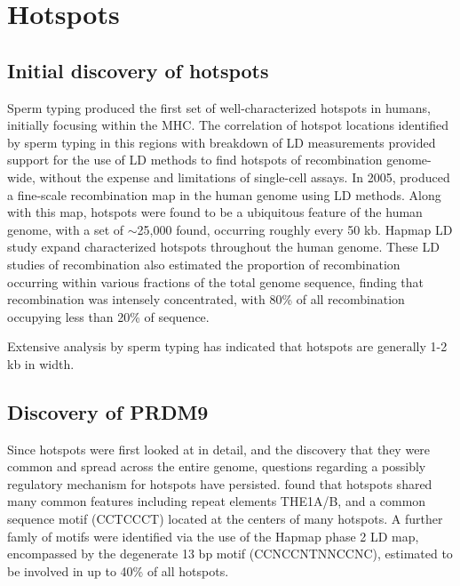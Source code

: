 \section{Hotspots}

\subsection{Initial discovery of hotspots}

Sperm typing produced the first set of well-characterized hotspots in humans, initially focusing within the MHC\cite{Jeffreys2000,Jeffreys2001}.
The correlation of hotspot locations identified by sperm typing in this regions with breakdown of LD measurements provided support for the use of LD methods to find hotspots of recombination genome-wide, without the expense and limitations of single-cell assays\cite{Jeffreys2001}.
In 2005, \citet{Myers2005} produced a fine-scale recombination map in the human genome using LD methods.
Along with this map, hotspots were found to be a ubiquitous feature of the human genome, with a set of $\sim$25,000 found, occurring roughly every 50 kb.
Hapmap LD study expand characterized hotspots throughout the human genome.
These LD studies of recombination also estimated the proportion of recombination occurring within various fractions of the total genome sequence, finding that recombination was intensely concentrated, with 80\% of all recombination occupying less than 20\% of sequence.

Extensive analysis by sperm typing has indicated that hotspots are generally 1-2 kb in width\cite{Jeffreys2004a,Arnheim2003}.


\subsection{Discovery of PRDM9}

Since hotspots were first looked at in detail, and the discovery that they were common and spread across the entire genome, questions regarding a possibly regulatory mechanism for hotspots have persisted.
\citet{Myers2005} found that hotspots shared many common features including repeat elements THE1A/B, and a common sequence motif (CCTCCCT) located at the centers of many hotspots.
A further famly of motifs were identified via the use of the Hapmap phase 2 LD map\cite{hapmap2007}, encompassed by the degenerate 13 bp motif (CCNCCNTNNCCNC)\cite{Myers2008}, estimated to be involved in up to 40\% of all hotspots.

